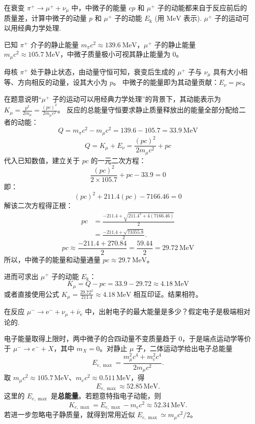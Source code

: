 \begin{exercise}\label{ex:30.11}
在衰变 $\pi^+ \rightarrow \mu^+ + \nu_\mu$ 中，中微子的能量 $cp$ 和 $\mu^+$ 子的动能都来自于反应前后的质量差，计算中微子的动量 $p$ 和 $\mu^+$ 子的动能 $E_{\mathrm{k}}$ (用 $\mathrm{MeV}$ 表示). $\mu^+$ 子的运动可以用经典力学处理.
\end{exercise}
\begin{solution}
已知 $\pi^+$ 介子的静止能量 $m_\pi c^2 \approx 139.6 \ \mathrm{MeV}$，$\mu^+$ 子的静止能量 $m_\mu c^2 \approx 105.7 \ \mathrm{MeV}$，中微子质量极小可视其静止能量为 $0$。

母核 $\pi^+$ 处于静止状态，由动量守恒可知，衰变后生成的 $\mu^+$ 子与 $\nu_\mu$ 具有大小相等、方向相反的动量，设其大小为 $p$。
中微子的能量即为其动量贡献：$E_\nu = pc$。

在题意说明“$\mu^+$ 子的运动可以用经典力学处理”的背景下，其动能表示为 $K_\mu = \frac{p^2}{2m_\mu} = \frac{(pc)^2}{2m_\mu c^2}$。
反应的总能量守恒要求静止质量释放出的能量全部分配给二者的动能：
$$ Q = m_\pi c^2 - m_\mu c^2 = 139.6 - 105.7 = 33.9 \ \mathrm{MeV} $$
$$ Q = K_\mu + E_\nu = \frac{(pc)^2}{2m_\mu c^2} + pc $$
代入已知数值，建立关于 $pc$ 的一元二次方程：
$$ \frac{(pc)^2}{2 \times 105.7} + pc - 33.9 = 0 $$
即：
$$ (pc)^2 + 211.4 (pc) - 7166.46 = 0 $$
解该二次方程得正根：
\[
\begin{aligned}
pc&=\frac{-211.4+\sqrt{211.4^2+4(7166.46)}}{2}\\
  &=\frac{-211.4+\sqrt{73355.8}}{2}.
\end{aligned}
\]
$$ pc \approx \frac{-211.4 + 270.84}{2} = \frac{59.44}{2} = 29.72 \ \mathrm{MeV} $$
所以，中微子的能量和动量通量 $pc \approx 29.7 \ \mathrm{MeV}$。

进而可求出 $\mu^+$ 子的动能 $E_{\mathrm{k}}$：
$$ K_\mu = Q - pc = 33.9 - 29.72 \approx 4.18 \ \mathrm{MeV} $$
或者直接使用公式 $K_\mu = \frac{29.72^2}{211.4} \approx 4.18 \ \mathrm{MeV}$ 相互印证。结果相符。
\end{solution}

\begin{exercise}\label{ex:30.12}
在反应 $\mu^- \rightarrow \mathrm{e}^- + \nu_\mu + \bar{\nu}_{\mathrm{e}}$ 中，出射电子的最大能量是多少？假定电子是极端相对论的.
\end{exercise}
\begin{solution}
电子能量取得上限时，两中微子的合四动量不变质量趋于 $0$，于是端点运动学等价于
$\mu^-\to e^-+X$，其中 $m_X=0$。对静止 $\mu$ 子，二体运动学给出电子总能量
\[
E_{e,\max}=\frac{m_\mu^2c^4+m_e^2c^4}{2m_\mu c^2}.
\]
取 $m_\mu c^2\approx105.7\,\mathrm{MeV}$、$m_ec^2\approx0.511\,\mathrm{MeV}$，得
\[
\boxed{E_{e,\max}\approx52.85\,\mathrm{MeV}}.
\]
这里的 $E_{e,\max}$ 是\textbf{总能量}。若题意特指电子动能，则
\[
K_{e,\max}=E_{e,\max}-m_ec^2\approx52.34\,\mathrm{MeV}.
\]
若进一步忽略电子静质量，就得到常用近似 $E_{e,\max}\simeq m_\mu c^2/2$。
\end{solution}

